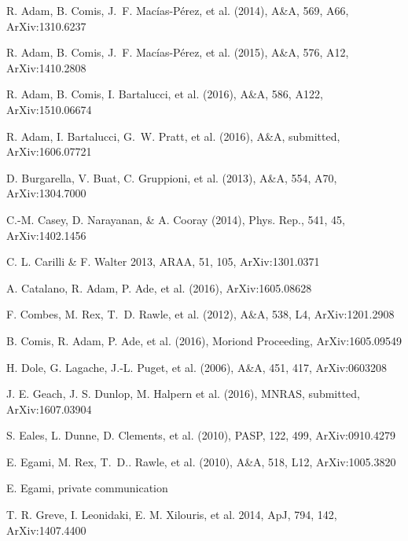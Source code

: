 \documentclass[11pt,a4paper,twoside,graphicx,color]{article}
\begin{document}
\begin{thebibliography}{9}
{\scriptsize

R. Adam, B. Comis, J.~F. Mac\'ias-P\'erez, et al. (2014), A\&A, 569, A66, ArXiv:1310.6237

R. Adam, B. Comis, J.~F. Mac\'ias-P\'erez, et al. (2015), A\&A, 576, A12, ArXiv:1410.2808

R. Adam, B. Comis, I. Bartalucci, et al. (2016), A\&A, 586, A122, ArXiv:1510.06674

R. Adam, I. Bartalucci, G.~W. Pratt, et al. (2016), A\&A, submitted, ArXiv:1606.07721

D. Burgarella, V. Buat, C. Gruppioni, et al. (2013), A\&A, 554, A70, ArXiv:1304.7000
	
C.-M. Casey, D. Narayanan, \& A. Cooray (2014), Phys. Rep., 541, 45, ArXiv:1402.1456

C. L. Carilli \& F. Walter 2013, ARAA, 51, 105, ArXiv:1301.0371

A. Catalano, R. Adam, P. Ade, et al. (2016), ArXiv:1605.08628

F. Combes, M. Rex, T.~D. Rawle, et al. (2012), A\&A, 538, L4, ArXiv:1201.2908

B. Comis, R. Adam, P. Ade, et al. (2016), Moriond Proceeding, ArXiv:1605.09549

H. Dole, G. Lagache, J.-L. Puget, et al. (2006), A\&A, 451, 417, ArXiv:0603208

J. E. Geach, J. S. Dunlop, M. Halpern et al. (2016), MNRAS, submitted, ArXiv:1607.03904

S. Eales, L. Dunne, D. Clements, et al. (2010), PASP, 122, 499, ArXiv:0910.4279

E. Egami, M. Rex, T.~D.. Rawle, et al. (2010), A\&A, 518, L12, ArXiv:1005.3820

E. Egami, private communication

T. R. Greve, I. Leonidaki, E. M. Xilouris, et al. 2014, ApJ, 794, 142, ArXiv:1407.4400

}
\end{thebibliography}
\end{document}
